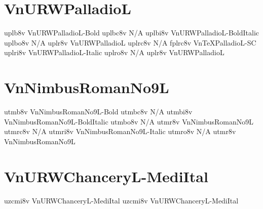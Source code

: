 \documentclass[sample]{vnsample}
\begin{document}
\section{VnURWPalladioL}
   {uplb8v}  {VnURWPalladioL-Bold}
  {uplbc8v} {N/A}
  {uplbi8v} {VnURWPalladioL-BoldItalic}
  {uplbo8v} {N/A}
   {uplr8v}  {VnURWPalladioL}
  {uplrc8v} {N/A}
  {fplrc8v} {VnTeXPalladioL-SC}
  {uplri8v} {VnURWPalladioL-Italic}
  {uplro8v} {N/A}
   {uplr8v}  {VnURWPalladioL}

\section{VnNimbusRomanNo9L}
   {utmb8v}  {VnNimbusRomanNo9L-Bold}
  {utmbc8v} {N/A}
  {utmbi8v} {VnNimbusRomanNo9L-BoldItalic}
  {utmbo8v} {N/A}
   {utmr8v}  {VnNimbusRomanNo9L}
  {utmrc8v} {N/A}
  {utmri8v} {VnNimbusRomanNo9L-Italic}
  {utmro8v} {N/A}
   {utmr8v}  {VnNimbusRomanNo9L}

\section{VnURWChanceryL-MediItal}
 {uzcmi8v}  {VnURWChanceryL-MediItal}
 {uzcmi8v}  {VnURWChanceryL-MediItal}
\end{document}
